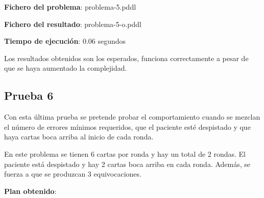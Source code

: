 \documentclass{uc3mpracticas}
\begin{document}
    \vspace{2mm}

    \textbf{Fichero del problema}: problema-5.pddl

    \textbf{Fichero del resultado}: problema-5-o.pddl

    \textbf{Tiempo de ejecución}: 0.06 segundos

    \vspace{3mm}

  Los resultados obtenidos son los esperados, funciona correctamente a pesar de que se haya aumentado la complejidad.

  \newpage

  \subsection{Prueba 6}

  Con esta última prueba se pretende probar el comportamiento cuando se mezclan el número de errores mínimos requeridos, que el paciente esté despistado y que haya cartas boca arriba al inicio de cada ronda.

  \vspace{3mm}

  En este problema se tienen 6 cartas por ronda y hay un total de 2 rondas. El paciente está despistado y hay 2 cartas boca arriba en cada ronda. Además, se fuerza a que se produzcan 3 equivocaciones.

  \vspace{3mm}

    \textbf{Plan obtenido}:
\end{document}
